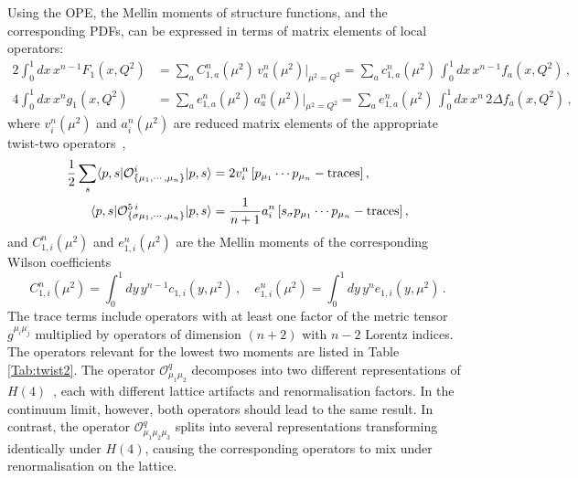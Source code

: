 Using the OPE, the Mellin moments of structure functions, and the corresponding PDFs, can be expressed in terms of matrix elements of local operators:
\begin{align}
\!\!\!2 \int_0^1 dx\, x^{n-1} F_1(x,Q^2) &= \sum_a C_{1,a}^n(\mu^2)\, v_a^n(\mu^2)|_{\mu^2=Q^2} = \sum_a c_{1,a}^n(\mu^2)\, \int_0^1 dx\, x^{n-1} f_a(x,Q^2)\,,\\
4 \int_0^1 dx\, x^n g_1(x,Q^2) &= \sum_a e_{1,a}^n(\mu^2)\, a_a^n(\mu^2)|_{\mu^2=Q^2} = \sum_a e_{1,a}^n(\mu^2)\, \int_0^1 dx\, x^n\, 2 \Delta f_a(x,Q^2)\,,
\end{align}
where $v_i^n(\mu^2)$ and $a_i^n(\mu^2)$ are reduced matrix elements of the appropriate twist-two operators~\cite{Gockeler:1995wg},
\begin{align}
\frac{1}{2} \sum_s \langle p,s|\mathcal{O}^i_{\{\mu_1,\cdots,\mu_n\}}|p,s\rangle = {} & 2 v_i^n\, [p_{\mu_1}\cdots p_{\mu_n} - {\rm traces}] \,, \label{eq:twist2me}\\
\langle p,s|\mathcal{O}^{5\,i}_{\{\sigma \mu_1,\cdots,\mu_n\}}|p,s\rangle = {} & \frac{1}{n+1} a_i^n\, [s_\sigma p_{\mu_1}\cdots p_{\mu_n} - {\rm traces}]\,,
\end{align}
and $C_{1,i}^n(\mu^2)$ and $e_{1,i}^n(\mu^2)$ are the Mellin moments of the corresponding Wilson coefficients
\begin{equation}
C_{1,i}^n(\mu^2) = \int_0^1 dy\, y^{n-1} c_{1,i}(y,\mu^2)\,, \quad
e_{1,i}^n(\mu^2) = \int_0^1 dy\, y^n e_{1,i}(y,\mu^2)\,.
\end{equation}
The trace terms include operators with at least one factor of the metric tensor $g^{\mu_i \mu_j}$ multiplied by
operators of dimension $(n+2)$ with $n-2$ Lorentz indices. The operators relevant for the lowest two moments are listed in Table \ref{Tab:twist2}. The operator $\mathcal{O}^q_{\mu_1\mu_2}$ decomposes into two different representations of $H(4)$~\cite{Gockeler:1996mu}, each with different lattice artifacts and renormalisation factors. In the continuum limit, however, both operators should lead to the same result. In contrast, the operator $\mathcal{O}^q_{\mu_1\mu_2\mu_3}$ splits into several representations transforming identically under $H(4)$, causing the corresponding operators to mix under renormalisation on the lattice.

